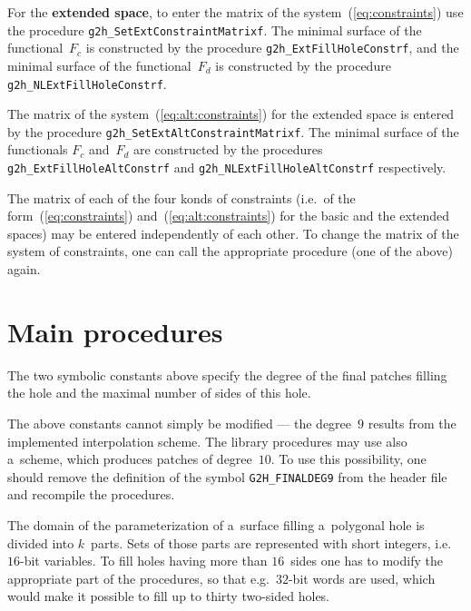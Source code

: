 For the \textbf{extended space}, to enter the matrix of the
system~(\ref{eq:constraints}) use the procedure
\texttt{g2h\_SetExtConstraintMatrixf}. The minimal surface of the functional~$F_c$
is constructed by the procedure \texttt{g2h\_ExtFillHoleConstrf},
and the minimal surface of the functional~$F_d$
is constructed by the procedure \texttt{g2h\_NLExtFillHoleConstrf}.

The matrix of the system~(\ref{eq:alt:constraints}) for the extended space
is entered by the procedure \texttt{g2h\_SetExtAltConstraintMatrixf}.
The minimal surface of the functionals $F_c$ and~$F_d$ are constructed by the
procedures \texttt{g2h\_ExtFillHoleAltConstrf} and
\texttt{g2h\_NLExtFillHoleAltConstrf} respectively.

The matrix of each of the four konds of constraints
(i.e.\ of the form~(\ref{eq:constraints}) and~(\ref{eq:alt:constraints}) for
the basic and the extended spaces) may be entered independently of each other.
To change the matrix of the system of constraints, one can call the
appropriate procedure (one of the above) again.


\section{Main procedures}

\hspace*{\parindent}
The two symbolic constants above specify the degree of the final patches
filling the hole and the maximal number of sides of this hole.

The above constants cannot simply be modified --- the degree~$9$ results from
the implemented interpolation scheme. The library procedures may use
also a~scheme, which produces patches of degree~$10$. To use this possibility,
one should remove the definition of the symbol
\texttt{G2H\_FINALDEG9} from the header file and recompile the procedures.

The domain of the parameterization of a~surface filling a~polygonal hole
is divided into $k$~parts. Sets of those parts are represented with
short integers, i.e.\ $16$-bit variables. To fill holes having more than
$16$~sides one has to modify the appropriate part of the procedures,
so that e.g.\ $32$-bit words are used, which would make it possible
to fill up to thirty two-sided holes.

